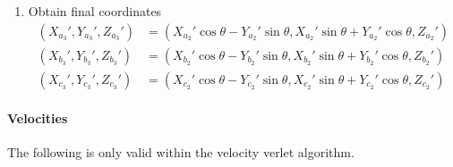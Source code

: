 \begin{enumerate}
\item Obtain final coordinates
\begin{align}
(X_{a_3}', Y_{a_3}',Z_{a_3}') &= 	(X_{a_2}' \cos\theta - Y_{a_2}'\sin\theta,
									 X_{a_2}' \sin\theta + Y_{a_2}'\cos\theta, Z_{a_2}')\\
(X_{b_3}', Y_{b_3}',Z_{b_3}') &= 	(X_{b_2}' \cos\theta - Y_{b_2}'\sin\theta, 
									 X_{b_2}' \sin\theta + Y_{b_2}'\cos\theta, Z_{b_2}')\\
(X_{c_3}', Y_{c_3}',Z_{c_3}') &=	(X_{c_2}' \cos\theta - Y_{c_2}'\sin\theta, 
									 X_{c_2}' \sin\theta + Y_{c_2}'\cos\theta, Z_{c_2}')
\end{align}
\end{enumerate}

\paragraph{Velocities}
The following is only valid within the velocity verlet algorithm.

